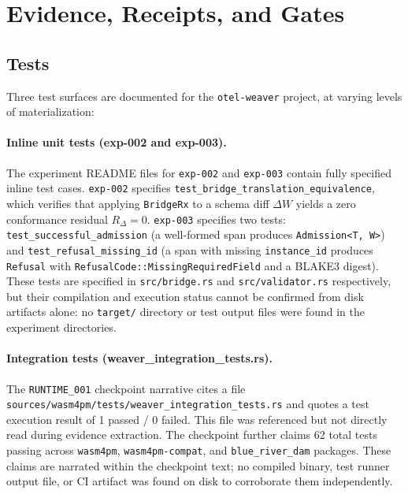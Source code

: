 
\section{Evidence, Receipts, and Gates}
\label{sec:otel-weaver-evidence}

\subsection{Tests}
\label{sec:otel-weaver-evidence-tests}

Three test surfaces are documented for the \texttt{otel-weaver} project, at varying levels of
materialization:

\paragraph{Inline unit tests (exp-002 and exp-003).}
The experiment README files for \texttt{exp-002} and \texttt{exp-003} contain fully specified
inline test cases. \texttt{exp-002} specifies \texttt{test\_bridge\_translation\_equivalence},
which verifies that applying \texttt{BridgeRx} to a schema diff $\Delta W$ yields a zero
conformance residual $R_\Delta = 0$. \texttt{exp-003} specifies two tests:
\texttt{test\_successful\_admission} (a well-formed span produces \texttt{Admission<T,\,W>})
and \texttt{test\_refusal\_missing\_id} (a span with missing \texttt{instance\_id} produces
\texttt{Refusal} with \texttt{RefusalCode::MissingRequiredField} and a BLAKE3 digest). These
tests are specified in \texttt{src/bridge.rs} and \texttt{src/validator.rs} respectively, but
their compilation and execution status cannot be confirmed from disk artifacts alone: no
\texttt{target/} directory or test output files were found in the experiment directories.

\paragraph{Integration tests (weaver\_integration\_tests.rs).}
The \texttt{RUNTIME\_001} checkpoint narrative cites a file
\texttt{sources/wasm4pm/tests/weaver\_integration\_tests.rs} and quotes a test execution
result of 1 passed / 0 failed. This file was referenced but not directly read during evidence
extraction. The checkpoint further claims 62 total tests passing across \texttt{wasm4pm},
\texttt{wasm4pm-compat}, and \texttt{blue\_river\_dam} packages. These claims are narrated
within the checkpoint text; no compiled binary, test runner output file, or CI artifact
was found on disk to corroborate them independently.

